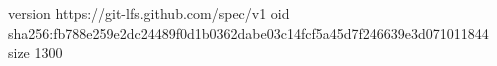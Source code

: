 version https://git-lfs.github.com/spec/v1
oid sha256:fb788e259e2dc24489f0d1b0362dabe03c14fcf5a45d7f246639e3d071011844
size 1300
